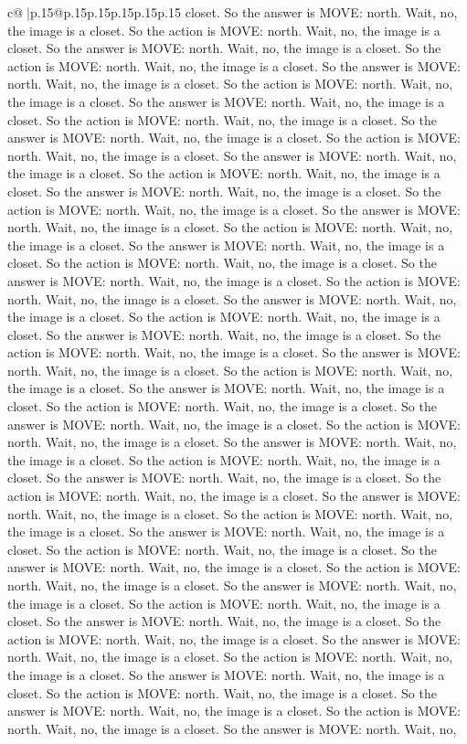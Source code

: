 \documentclass{article}
\begin{document}
{\begin{supertabular}{c@{$\;$}|p{.15\linewidth}@{}p{.15\linewidth}p{.15\linewidth}p{.15\linewidth}p{.15\linewidth}p{.15\linewidth}}
{{{closet. So the answer is MOVE: north. Wait, no, the image is a closet. So the action is MOVE: north. Wait, no, the image is a closet. So the answer is MOVE: north. Wait, no, the image is a closet. So the action is MOVE: north. Wait, no, the image is a closet. So the answer is MOVE: north. Wait, no, the image is a closet. So the action is MOVE: north. Wait, no, the image is a closet. So the answer is MOVE: north. Wait, no, the image is a closet. So the action is MOVE: north. Wait, no, the image is a closet. So the answer is MOVE: north. Wait, no, the image is a closet. So the action is MOVE: north. Wait, no, the image is a closet. So the answer is MOVE: north. Wait, no, the image is a closet. So the action is MOVE: north. Wait, no, the image is a closet. So the answer is MOVE: north. Wait, no, the image is a closet. So the action is MOVE: north. Wait, no, the image is a closet. So the answer is MOVE: north. Wait, no, the image is a closet. So the action is MOVE: north. Wait, no, the image is a closet. So the answer is MOVE: north. Wait, no, the image is a closet. So the action is MOVE: north. Wait, no, the image is a closet. So the answer is MOVE: north. Wait, no, the image is a closet. So the action is MOVE: north. Wait, no, the image is a closet. So the answer is MOVE: north. Wait, no, the image is a closet. So the action is MOVE: north. Wait, no, the image is a closet. So the answer is MOVE: north. Wait, no, the image is a closet. So the action is MOVE: north. Wait, no, the image is a closet. So the answer is MOVE: north. Wait, no, the image is a closet. So the action is MOVE: north. Wait, no, the image is a closet. So the answer is MOVE: north. Wait, no, the image is a closet. So the action is MOVE: north. Wait, no, the image is a closet. So the answer is MOVE: north. Wait, no, the image is a closet. So the action is MOVE: north. Wait, no, the image is a closet. So the answer is MOVE: north. Wait, no, the image is a closet. So the action is MOVE: north. Wait, no, the image is a closet. So the answer is MOVE: north. Wait, no, the image is a closet. So the action is MOVE: north. Wait, no, the image is a closet. So the answer is MOVE: north. Wait, no, the image is a closet. So the action is MOVE: north. Wait, no, the image is a closet. So the answer is MOVE: north. Wait, no, the image is a closet. So the action is MOVE: north. Wait, no, the image is a closet. So the answer is MOVE: north. Wait, no, the image is a closet. So the action is MOVE: north. Wait, no, the image is a closet. So the answer is MOVE: north. Wait, no, the image is a closet. So the action is MOVE: north. Wait, no, the image is a closet. So the answer is MOVE: north. Wait, no, the image is a closet. So the action is MOVE: north. Wait, no, the image is a closet. So the answer is MOVE: north. Wait, no, the image is a closet. So the action is MOVE: north. Wait, no, the image is a closet. So the answer is MOVE: north. Wait, no, the image is a closet. So the action is MOVE: north. Wait, no, the image is a closet. So the answer is MOVE: north. Wait, no, the image is a closet. So the action is MOVE: north. Wait, no, the image is a closet. So the answer is MOVE: north. Wait, no, }}}
\end{supertabular}}
\end{document}

